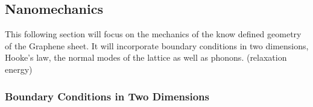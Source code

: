 
\subsection{Nanomechanics}
This following section will focus on the mechanics of the know defined geometry of the Graphene sheet. It will incorporate boundary conditions in two dimensions, Hooke's law, the normal modes of the lattice as well as phonons. (relaxation energy)

\subsubsection{Boundary Conditions in Two Dimensions}
 